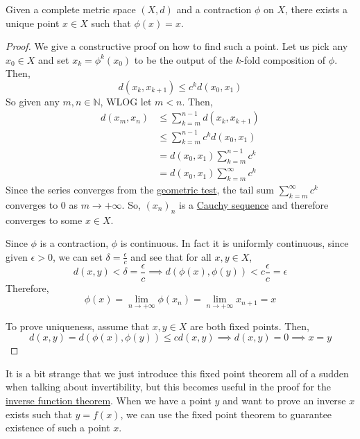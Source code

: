 	\begin{theorem}
	  \label{thm:banach-fixed-point-theorem}
	  Given a complete metric space $(X, d)$ and a contraction $\phi$ on $X$, there exists a unique point $x \in X$ such that $\phi(x) = x$. 
	\end{theorem}
	\begin{proof}
		We give a constructive proof on how to find such a point. Let us pick any $x_0 \in X$ and set $x_k = \phi^k (x_0)$ to be the output of the $k$-fold composition of $\phi$. Then, 
		\begin{equation}
			d(x_k, x_{k+1}) \leq c^k d(x_0, x_1)
		\end{equation}
		So given any $m, n \in \mathbb{N}$, WLOG let $m < n$. Then, 
		\begin{align}
			d(x_m, x_n) & \leq \sum_{k = m}^{n-1} d(x_k, x_{k+1}) \\ 
									& \leq \sum_{k=m}^{n-1} c^k d(x_0, x_1) \\ 
									& = d(x_0, x_1) \sum_{k=m}^{n-1} c^k \\ 
									& = d(x_0, x_1) \sum_{k=m}^{\infty} c^k 
		\end{align}
		Since the series converges from the \hyperref[real-ex:geometric_series]{geometric test}, the tail sum $\sum_{k=m}^\infty c^k$ converges to $0$ as $m \to +\infty$. So, $(x_n)_n$ is a \hyperref[real-def:cauchy-sequence]{Cauchy sequence} and therefore converges to some $x \in X$. 

		Since $\phi$ is a contraction, $\phi$ is continuous. In fact it is uniformly continuous, since given $\epsilon > 0$, we can set $\delta = \frac{\epsilon}{c}$ and see that for all $x, y \in X$, 
		\begin{equation}
			d(x, y) < \delta = \frac{\epsilon}{c} \implies d(\phi(x), \phi(y)) < c \frac{\epsilon}{c} = \epsilon
		\end{equation}
		Therefore, 
		\begin{equation}
			\phi(x) = \lim_{n \to +\infty} \phi(x_n) = \lim_{n \to +\infty} x_{n+1} = x
		\end{equation}

		To prove uniqueness, assume that $x, y \in X$ are both fixed points. Then, 
		\begin{equation}
		  d(x, y) = d(\phi(x), \phi(y)) \leq c d(x, y) \implies d(x, y) = 0 \implies x = y
		\end{equation}
	\end{proof}

	It is a bit strange that we just introduce this fixed point theorem all of a sudden when talking about invertibility, but this becomes useful in the proof for the \hyperref[real-thm:inverse-ft]{inverse function theorem}. When we have a point $y$ and want to prove an inverse $x$ exists such that $y = f(x)$, we can use the fixed point theorem to guarantee existence of such a point $x$. 

